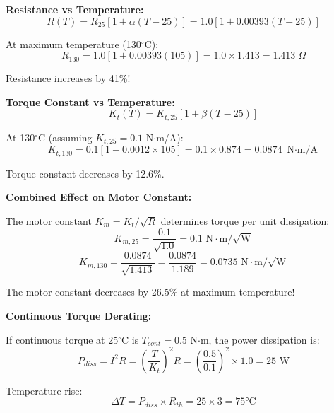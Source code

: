 \textbf{Resistance vs Temperature:}
\begin{equation}
    R(T) = R_{25}[1 + \alpha(T - 25)] = 1.0[1 + 0.00393(T - 25)]
\end{equation}

At maximum temperature (130$^\circ$C):
\begin{equation}
    R_{130} = 1.0[1 + 0.00393(105)] = 1.0 \times 1.413 = 1.413 \; \Omega
\end{equation}

Resistance increases by 41\%!

\textbf{Torque Constant vs Temperature:}
\begin{equation}
    K_t(T) = K_{t,25}[1 + \beta(T - 25)]
\end{equation}

At 130$^\circ$C (assuming $K_{t,25} = 0.1$ N$\cdot$m/A):
\begin{equation}
    K_{t,130} = 0.1[1 - 0.0012 \times 105] = 0.1 \times 0.874 = 0.0874 \text{ N$\cdot$m/A}
\end{equation}

Torque constant decreases by 12.6\%.

\textbf{Combined Effect on Motor Constant:}

The motor constant $K_m = K_t / \sqrt{R}$ determines torque per unit dissipation:
\begin{equation}
    K_{m,25} = \frac{0.1}{\sqrt{1.0}} = 0.1 \text{ N$\cdot$m/$\sqrt{\text{W}}$}
\end{equation}
\begin{equation}
    K_{m,130} = \frac{0.0874}{\sqrt{1.413}} = \frac{0.0874}{1.189} = 0.0735 \text{ N$\cdot$m/$\sqrt{\text{W}}$}
\end{equation}

The motor constant decreases by 26.5\% at maximum temperature!

\textbf{Continuous Torque Derating:}

If continuous torque at 25$^\circ$C is $T_{cont} = 0.5$ N$\cdot$m, the power dissipation is:
\begin{equation}
    P_{diss} = I^2 R = \left(\frac{T}{K_t}\right)^2 R = \left(\frac{0.5}{0.1}\right)^2 \times 1.0 = 25 \text{ W}
\end{equation}

Temperature rise:
\begin{equation}
    \Delta T = P_{diss} \times R_{th} = 25 \times 3 = 75°\text{C}
\end{equation}

